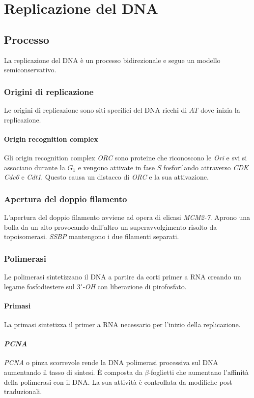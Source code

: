 \chapter{Replicazione del DNA}

\section{Processo}
La replicazione del DNA \`e un processo bidirezionale e segue un modello semiconservativo.

	\subsection{Origini di replicazione}
	Le origini di replicazione sono siti specifici del DNA ricchi di $AT$ dove inizia la replicazione.

		\subsubsection{Origin recognition complex}
		Gli origin recognition complex \emph{ORC} sono proteine che riconoscono le \emph{Ori} e svi si associano durante la $G_1$ e vengono attivate in fase $S$ fosforilando attraverso \emph{CDK} \emph{Cdc6} e \emph{Cdt1}.
		Questo causa un distacco di \emph{ORC} e la sua attivazione.

	\subsection{Apertura del doppio filamento}
	L'apertura del doppio filamento avviene ad opera di elicasi \emph{MCM2-7}.
	Aprono una bolla da un alto provocando dall'altro un superavvolgimento risolto da topoisomerasi.
	\emph{SSBP} mantengono i due filamenti separati.

	\subsection{Polimerasi}
	Le polimerasi sintetizzano il DNA a partire da corti primer a RNA creando un legame fosfodiestere sul \emph{$3'$-OH} con liberazione di pirofosfato.

		\subsubsection{Primasi}
		La primasi sintetizza il primer a RNA necessario per l'inizio della replicazione.

		\subsubsection{\emph{PCNA}}
		\emph{PCNA} o pinza scorrevole rende la DNA polimerasi processiva sul DNA aumentando il tasso di sintesi.
		\`E composta da $\beta$-foglietti che aumentano l'affinit\`a della polimerasi con il DNA.
		La sua attivit\`a \`e controllata da modifiche post-traduzionali.

